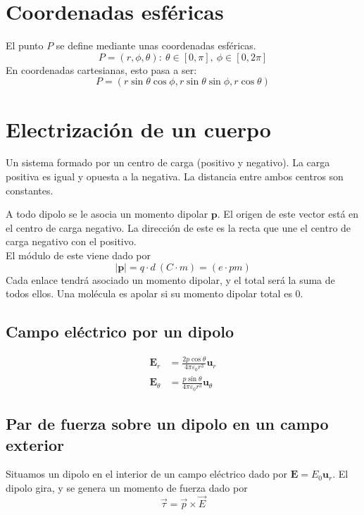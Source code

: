 \documentclass{../FisicaII.tex}
\begin{document}
\section{Coordenadas esféricas}
El punto $P$ se define mediante unas coordenadas esféricas.
$$
P = (r,\phi,\theta):~\theta \in[0,\pi],~\phi \in[0,2\pi]
$$
En coordenadas cartesianas, esto pasa a ser:
$$
P=(r\sin\theta \cos \phi, r\sin\theta \sin \phi, r\cos\theta)
$$
\section{Electrización de un cuerpo}
\begin{defin}
Un sistema formado por un centro de carga (positivo y negativo). La carga positiva es igual y opuesta a la negativa. La distancia entre ambos centros son constantes.
\end{defin}
\begin{defin}
A todo dipolo se le asocia un momento dipolar $\mathbf{p}$. El origen de este vector está en el centro de carga negativo. La dirección de este es la recta que une el centro de carga negativo con el positivo.\\
El módulo de este viene dado por
\[
	|\mathbf{p}|=q\cdot d~(C\cdot m)=(e\cdot pm)
\]
Cada enlace tendrá asociado un momento dipolar, y el total será la suma de todos ellos. Una molécula es apolar si su momento dipolar total es $0$.
\end{defin}
\subsection{Campo eléctrico por un dipolo}
\begin{equation}
	\begin{split}
		\mathbf{E}_{r}&=\frac{2p\cos\theta}{4\pi\varepsilon_{0}r^{3}} \mathbf{u}_{r}\\
\mathbf{E}_{\theta}&= \frac{p \sin\theta}{4\pi\varepsilon_{0}r^{3}}\mathbf{u}_{\theta}
	\end{split}
\end{equation}
\subsection{Par de fuerza sobre un dipolo en un campo exterior}
Situamos un dipolo en el interior de un campo eléctrico dado por $\mathbf{E}=E_{0}\mathbf{u}_{r}$. El dipolo gira, y se genera un momento de fuerza dado por
$$
\vec{\tau}= \vec{p}\times \vec{E}
$$
\end{document}
